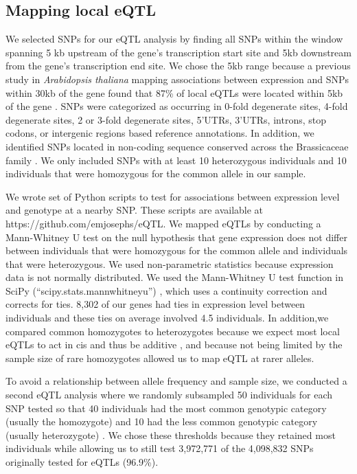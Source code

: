 \subsection{Mapping local eQTL}
We selected SNPs for our eQTL analysis by finding all SNPs within the window spanning 5 kb upstream of the gene’s transcription start site and 5kb downstream from the gene’s transcription end site. We chose the 5kb range because a previous study in \textit{Arabidopsis thaliana} mapping associations between expression and SNPs within 30kb of the gene found that 87\% of local eQTLs were located within 5kb of the gene \citep{Gan2011-xv}. SNPs were categorized as occurring in 0-fold degenerate sites, 4-fold degenerate sites, 2 or 3-fold degenerate sites, 5'UTRs, 3'UTRs, introns, stop codons, or intergenic regions based reference annotations\citep{Slotte2013-py}. In addition, we identified SNPs located in non-coding sequence conserved across the Brassicaceae family \citep{Haudry2013-qe}. We only included SNPs with at least 10 heterozygous individuals and 10 individuals that were homozygous for the common allele in our sample.

We wrote set of Python scripts to test for associations between expression level and genotype at a nearby SNP. These scripts are available at https://github.com/emjosephs/eQTL. We mapped eQTLs by conducting a Mann-Whitney U test on the null hypothesis that gene expression does not differ between individuals that were homozygous for the common allele and individuals that were heterozygous. We used non-parametric statistics because expression data is not normally distributed. We used the Mann-Whitney U test function in SciPy (“scipy.stats.mannwhitneyu”) \citep{Jones2001-in}, which uses a continuity correction and corrects for ties. 8,302 of our genes had ties in expression level between individuals and these ties on average involved 4.5 individuals. In addition,we compared common homozygotes to heterozygotes because we expect most local eQTLs to act in cis and thus be additive \citep{Pickrell2010-ci}, and because not being limited by the sample size of rare homozygotes allowed us to map eQTL at rarer alleles. 

To avoid a relationship between allele frequency and sample size, we conducted a second eQTL analysis where we randomly subsampled 50 individuals for each SNP tested so that 40 individuals had the most common genotypic category (usually the homozygote) and 10 had the less common genotypic category (usually heterozygote) \citep{Battle2014-ke}. We chose these thresholds because they retained most individuals while allowing us to still test 3,972,771 of the 4,098,832 SNPs originally tested for eQTLs (96.9\%).

